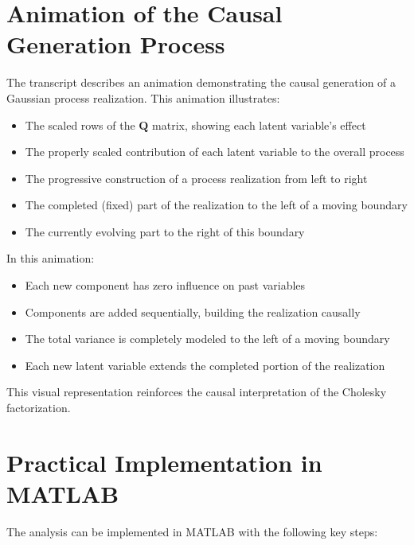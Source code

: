 \documentclass{article}
\begin{document}
\section{Animation of the Causal Generation Process}

The transcript describes an animation demonstrating the causal generation of a Gaussian process realization. This animation illustrates:

\begin{itemize}
    \item The scaled rows of the $\mathbf{Q}$ matrix, showing each latent variable's effect
    \item The properly scaled contribution of each latent variable to the overall process
    \item The progressive construction of a process realization from left to right
    \item The completed (fixed) part of the realization to the left of a moving boundary
    \item The currently evolving part to the right of this boundary
\end{itemize}

In this animation:
\begin{itemize}
    \item Each new component has zero influence on past variables
    \item Components are added sequentially, building the realization causally
    \item The total variance is completely modeled to the left of a moving boundary
    \item Each new latent variable extends the completed portion of the realization
\end{itemize}

This visual representation reinforces the causal interpretation of the Cholesky factorization.

\section{Practical Implementation in MATLAB}

The analysis can be implemented in MATLAB with the following key steps:
\end{document}
